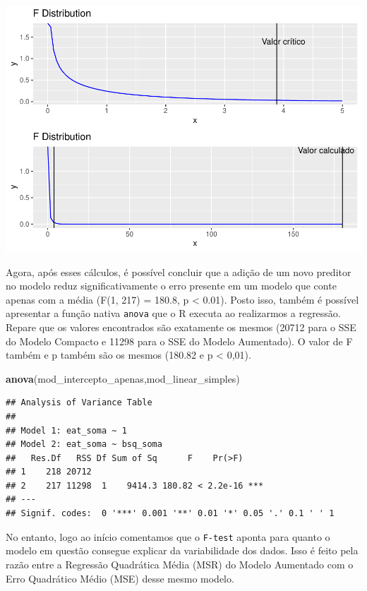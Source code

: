\documentclass[
]{book}
\newenvironment{Shaded}{\begin{snugshade}}{\end{snugshade}}
\newcommand{\KeywordTok}[1]{\textcolor[rgb]{0.13,0.29,0.53}{\textbf{#1}}}
\newcommand{\NormalTok}[1]{#1}
\begin{document}
\begin{center}\includegraphics{gitbook-demo_files/figure-latex/unnamed-chunk-90-1} \end{center}

Agora, após esses cálculos, é possível concluir que a adição de um novo preditor no modelo reduz significativamente o erro presente em um modelo que conte apenas com a média (F(1, 217) = 180.8, p \textless{} 0.01). Posto isso, também é possível apresentar a função nativa \texttt{anova} que o R executa ao realizarmos a regressão. Repare que os valores encontrados são exatamente os mesmos (20712 para o SSE do Modelo Compacto e 11298 para o SSE do Modelo Aumentado). O valor de F também e p também são os mesmos (180.82 e p \textless{} 0,01).

\begin{Shaded}
\begin{Highlighting}[]
\KeywordTok{anova}\NormalTok{(mod_intercepto_apenas,mod_linear_simples)}
\end{Highlighting}
\end{Shaded}

\begin{verbatim}
## Analysis of Variance Table
## 
## Model 1: eat_soma ~ 1
## Model 2: eat_soma ~ bsq_soma
##   Res.Df   RSS Df Sum of Sq      F    Pr(>F)    
## 1    218 20712                                  
## 2    217 11298  1    9414.3 180.82 < 2.2e-16 ***
## ---
## Signif. codes:  0 '***' 0.001 '**' 0.01 '*' 0.05 '.' 0.1 ' ' 1
\end{verbatim}

No entanto, logo ao início comentamos que o \texttt{F-test} aponta para quanto o modelo em questão consegue explicar da variabilidade dos dados. Isso é feito pela razão entre a Regressão Quadrática Média (MSR) do Modelo Aumentado com o Erro Quadrático Médio (MSE) desse mesmo modelo.
\end{document}
